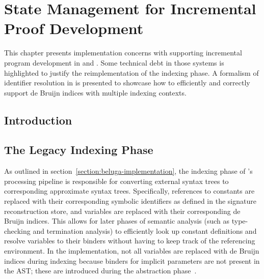 \chapter{State Management for Incremental Proof Development}

This chapter presents implementation concerns with supporting incremental program development in \Beluga and \Harpoon.
Some technical debt in those systems is highlighted to justify the reimplementation of the indexing phase.
A formalism of identifier resolution in \Beluga is presented to showcase how to efficiently and correctly support de Bruijn indices with multiple indexing contexts.

\section{Introduction}




\section{The Legacy Indexing Phase}


As outlined in section~\ref{section:beluga-implementation}, the indexing phase of \Beluga's processing pipeline is responsible for converting external syntax trees to corresponding approximate syntax trees.
Specifically, references to constants are replaced with their corresponding symbolic identifiers as defined in the signature reconstruction store, and variables are replaced with their corresponding de Bruijn indices.
This allows for later phases of semantic analysis (such as type-checking and termination analysis) to efficiently look up constant definitions and resolve variables to their binders without having to keep track of the referencing environment.
In the implementation, not all variables are replaced with de Bruijn indices during indexing because binders for implicit parameters are not present in the \ac{AST}; these are introduced during the abstraction phase~\cite{germain2010implementation}.

